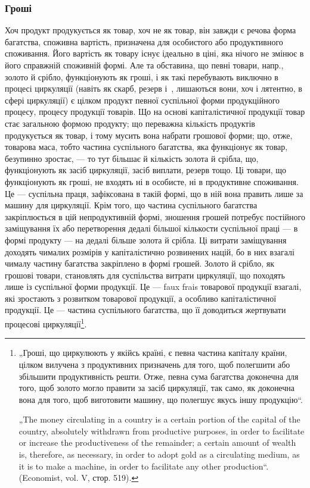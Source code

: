 \subsubsection{Гроші}

Хоч продукт продукується як товар, хоч не як товар, він завжди є
речова форма багатства, споживна вартість, призначена для особистого
або продуктивного споживання. Його вартість як товару існує ідеально
в ціні, яка нічого не змінює в його справжній споживній формі. Але та
обставина, що певні товари, напр., золото й срібло, функціонують як
гроші, і як такі перебувають виключно в процесі циркуляції (навіть як
скарб, резерв і~, лишаються вони, хоч і лятентно, в сфері
циркуляції) є цілком продукт певної суспільної форми продукційного
процесу, процесу продукції товарів. Що на основі капіталістичної продукції
товар стає загальною формою продукту; що переважна кількість
продуктів продукується як товар, і тому мусить вона набрати грошової
форми; що, отже, товарова маса, тобто частина суспільного багатства,
яка функціонує як товар, безупинно зростає, — то тут більшає й кількість
золота й срібла, що, функціонують як засіб циркуляції, засіб виплати,
резерв тощо. Ці товари, що функціонують як гроші, не входять ні в
особисте, ні в продуктивне споживання. Це — суспільна праця, зафіксована
в такій формі, що в ній вона править лише за машину для циркуляції.
Крім того, що частина суспільного багатства закріплюється в цій
непродуктивній формі, зношення грошей потребує постійного заміщування
їх або перетворення дедалі більшої кількости суспільної праці — в
формі продукту — на дедалі більше золота й срібла. Ці витрати заміщування
доходять чималих розмірів у капіталістично розвинених націй, бо
в них взагалі чималу частину багатства закріплено в формі грошей.
Золото й срібло, як грошові товари, становлять для суспільства витрати
циркуляції, що походять лише із суспільної форми продукції. Це — faux frais
товарової продукції взагалі, які зростають з розвитком товарової продукції,
а особливо капіталістичної продукції. Це — частина суспільного
багатства, що її доводиться жертвувати процесові циркуляції\footnote{
„Гроші, що циркулюють у якійсь країні, є певна частина капіталу
країни, цілком вилучена з продуктивних призначень для того, щоб полегшити
або збільшити продуктивність решти. Отже, певна сума багатства доконечна
для того, щоб золото могло правити за засіб циркуляції, так само, як доконечна
вона для того, щоб виготовити машину, що полегшує якусь іншу
продукцію“.

„The money circulating in a country is a certain portion of the capital of the
country, absolutely withdrawn from productive purposes, in order to facilitate
or increase the productiveness of the remainder; a certain amount of wealth
is, therefore, as necessary, in order to adopt gold as a circulating medium,
as it is to make a machine, in order to facilitate any other production“. (Economist,
vol. V, стор. 519).
}.

